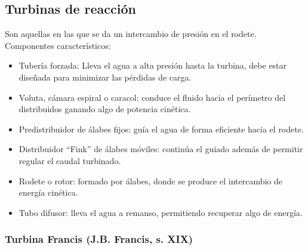 \begin{table}[H]
    \centering
\end{table}

\subsection{Turbinas de reacción}
Son aquellas en las que se da un intercambio de presión en el rodete. Componentes característicos:
\begin{itemize}
    \item Tubería forzada: Lleva el agua a alta presión hasta la turbina, debe estar diseñada para minimizar las pérdidas de carga.
    \item Voluta, cámara espiral o caracol: conduce el fluido hacia el perímetro del distribuidos ganando algo de potencia cinética.
    \item Predistribuidor de álabes fijos: guía el agua de forma eficiente hacia el rodete.
    \item Distribuidor ``Fink'' de álabes móviles: continúa el guiado además de permitir regular el caudal turbinado.
    \item Rodete o rotor: formado por álabes, donde se produce el intercambio de energía cinética.
    \item Tubo difusor: lleva el agua a remanso, permitiendo recuperar algo de energía.
\end{itemize}

\subsubsection{Turbina Francis (J.B. Francis, s. XIX)}
